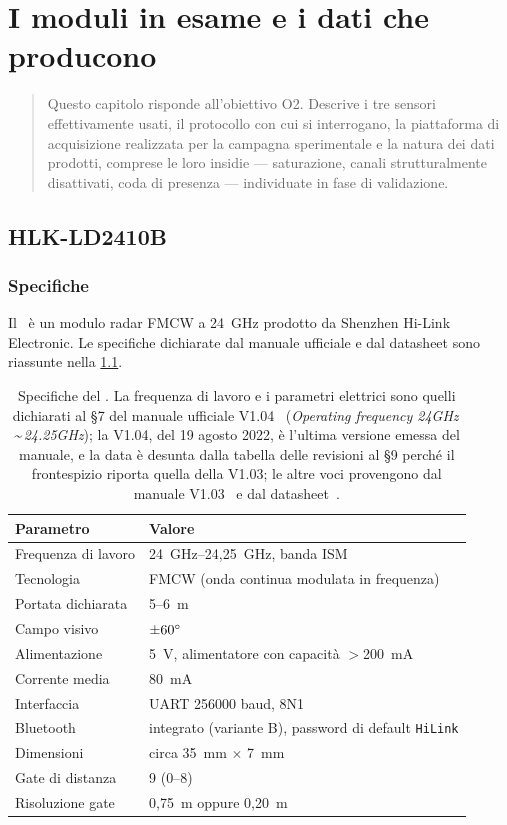 \chapter{I moduli in esame e i dati che producono}
\label{cap:moduli}

\begin{quote}\small
Questo capitolo risponde all'obiettivo O2. Descrive i tre sensori effettivamente
usati, il protocollo con cui si interrogano, la piattaforma di acquisizione
realizzata per la campagna sperimentale e la natura dei dati prodotti, comprese le
loro insidie --- saturazione, canali strutturalmente disattivati, coda di presenza
--- individuate in fase di validazione.
\end{quote}

\section{HLK-LD2410B}
\label{sec:ld2410b}

\subsection{Specifiche}

Il \ldb\ è un modulo radar FMCW a 24~GHz prodotto da Shenzhen Hi-Link
Electronic. Le specifiche dichiarate dal manuale ufficiale e dal datasheet sono
riassunte nella \cref{tab:ld2410b-specs}.

\begin{table}[htbp]
\centering
\caption{Specifiche del \ldb. La frequenza di lavoro e i parametri elettrici sono
quelli dichiarati al \S7 del manuale ufficiale V1.04~\cite{hilinkManualV104}
(\emph{Operating frequency 24GHz\,\textasciitilde\,24.25GHz}); la V1.04, del
19 agosto 2022, \`e l'ultima versione emessa del manuale, e la data \`e desunta
dalla tabella delle revisioni al \S9 perch\'e il frontespizio riporta quella
della V1.03;
le altre voci provengono dal manuale V1.03~\cite{hilinkManualV103} e dal
datasheet~\cite{ld2410bDatasheet}.}
\label{tab:ld2410b-specs}
\small
\begin{tabular}{@{}ll@{}}
\toprule
\textbf{Parametro} & \textbf{Valore} \\
\midrule
Frequenza di lavoro & 24~GHz--24,25~GHz, banda ISM \\
Tecnologia & FMCW (onda continua modulata in frequenza) \\
Portata dichiarata & 5--6~m \\
Campo visivo & $\pm 60\degree$ \\
Alimentazione & 5~V, alimentatore con capacità $>$200~mA \\
Corrente media & 80~mA \\
Interfaccia & UART 256000 baud, 8N1 \\
Bluetooth & integrato (variante B), password di default \texttt{HiLink} \\
Dimensioni & circa 35~mm $\times$ 7~mm \\
Gate di distanza & 9 (0--8) \\
Risoluzione gate & 0,75~m oppure 0,20~m \\
\bottomrule
\end{tabular}
\end{table}

